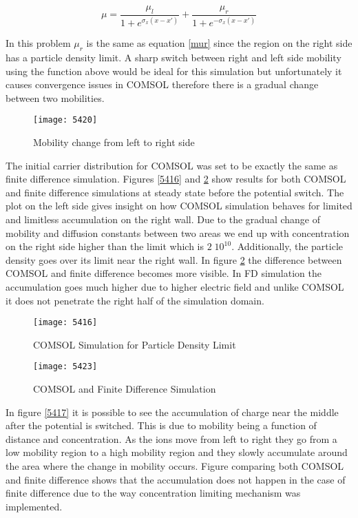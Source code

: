 \begin{doublespace}
\begin{equation}
\mu=\frac{\mu_{l}}{1+e^{\sigma_x(x-x')}}+\frac{\mu_{r}}{1+e^{-\sigma_x(x-x')}}
\end{equation}

In this problem $\mu_r$ is the same as equation \ref{mur} since the region on the right side has a particle density limit. A sharp switch between right and left side mobility using the function above would be ideal for this simulation but unfortunately it causes convergence issues in COMSOL therefore there is a gradual change between two mobilities. 

\begin{figure}[!htp]
\centering
\texttt{[image: 5420]}
\caption{Mobility change from left to right side} 
\label{5420}
\end{figure}

The initial carrier distribution for COMSOL was set to be exactly the same as finite difference simulation. Figures \ref{5416} and \ref{5423} show results for both COMSOL and finite difference simulations at steady state before the potential switch. The plot on the left side gives insight on how COMSOL simulation behaves for limited and limitless accumulation on the right wall. Due to the gradual change of mobility and diffusion constants between two areas we end up with concentration on the right side higher than the limit which is $2 \; 10^{10}$. Additionally, the particle density goes over its limit near the right wall. In figure \ref{5423} the difference between COMSOL and finite difference becomes more visible. In FD simulation the accumulation goes much higher due to higher electric field and unlike COMSOL it does not penetrate the right half of the simulation domain. 

\begin{figure}[ht]
\centering
\begin{minipage}[b]{0.45\linewidth}
\texttt{[image: 5416]}
\caption{COMSOL Simulation for Particle Density Limit}
\label{5416}
\end{minipage}
\quad
\begin{minipage}[b]{0.45\linewidth}
\texttt{[image: 5423]}
\caption{COMSOL and Finite Difference Simulation}
\label{5423}
\end{minipage}
\end{figure}


In figure \ref{5417} it is possible to see the accumulation of charge near the middle after the potential is switched. This is due to mobility being a function of distance and concentration. As the ions move from left to right they go from a low mobility region to a high mobility region and they slowly accumulate around the area where the change in mobility occurs. Figure comparing both COMSOL and finite difference shows that the accumulation does not happen in the case of finite difference due to the way concentration limiting mechanism was implemented.


\end{doublespace}
